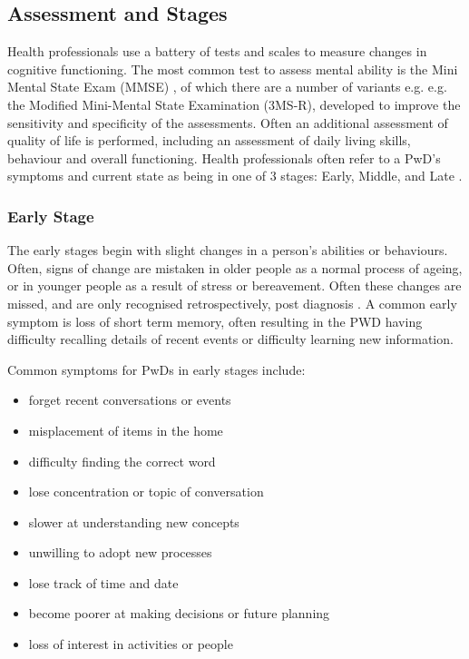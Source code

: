 \subsection{Assessment and Stages}
Health professionals use a battery of tests and scales to measure changes in cognitive functioning. The most common test to assess mental ability is the Mini Mental State Exam (MMSE) \cite{Folstein1975}, of which there are a number of variants e.g. e.g. the Modified Mini-Mental State Examination (3MS-R)\cite{Tschanz2002}, developed to improve the sensitivity and specificity of the assessments. Often an additional assessment of quality of life is performed, including an assessment of daily living skills, behaviour and overall functioning. Health professionals often refer to a PwD's symptoms and current state as being in one of 3 stages: Early, Middle, and Late \cite{2015AlzheimersDiseaseFactsFigures, AlzheimersAssociation2015a, Grout2015}.

\subsubsection{Early Stage}
The early stages begin with slight changes in a person's abilities or behaviours. Often, signs of change are mistaken in older people as a normal process of ageing, or in younger people as a result of stress or bereavement. Often these changes are missed, and are only recognised retrospectively, post diagnosis \cite{Grout2015}. A common early symptom is loss of short term memory, often resulting in the PWD having difficulty recalling details of recent events or difficulty learning new information.

Common symptoms for PwDs in early stages include:

\begin{itemize}[noitemsep,topsep=0pt]
\item forget recent conversations or events
\item misplacement of items in the home
\item difficulty finding the correct word
\item lose concentration or topic of conversation
\item slower at understanding new concepts
\item unwilling to adopt new processes
\item lose track of time and date
\item become poorer at making decisions or future planning
\item loss of interest in activities or people
\end{itemize}

